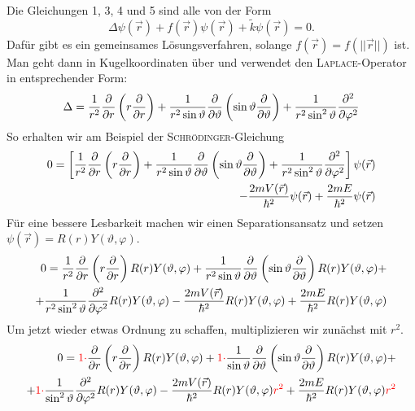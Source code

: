 \documentclass[a4paper,12pt,portrait]{book}
\numberwithin{equation}{section}
\begin{document}
Die Gleichungen 1, 3, 4 und 5 sind alle von der Form
\begin{equation*}
\Delta\psi(\vec{r}) + f(\vec{r})\psi(\vec{r}) + \tilde{k}\psi(\vec{r}) = 0.
\end{equation*}
Dafür gibt es ein gemeinsames Lösungsverfahren, solange $f(\vec{r}) = f\left(||\vec{r}||\right)$ ist. Man geht dann in Kugelkoordinaten über und verwendet den \textsc{Laplace}-Operator in entsprechender Form:
\begin{equation*}
\Delta = \frac{1}{r^2}\frac{\partial{}}{\partial{r}}\left(r\frac{\partial{}}{\partial{r}}\right) + \frac{1}{r^2\sin\vartheta}\frac{\partial{}}{\partial{\vartheta}}\left(\sin\vartheta\frac{\partial{}}{\partial{\vartheta}}\right) + \frac{1}{r^2\sin^2\vartheta}\frac{\partial^2}{\partial\varphi^2}
\end{equation*}
So erhalten wir am Beispiel der \textsc{Schrödinger}-Gleichung
\begin{align*}
0 = \left[\frac{1}{r^2}\frac{\partial{}}{\partial{r}}\left(r\frac{\partial{}}{\partial{r}}\right) + \frac{1}{r^2\sin\vartheta}\frac{\partial{}}{\partial{\vartheta}}\left(\sin\vartheta\frac{\partial{}}{\partial{\vartheta}}\right) + \frac{1}{r^2\sin^2\vartheta}\frac{\partial^2}{\partial\varphi^2}\right]\psi(\vec{r})  \\  - \frac{2mV(\vec{r})}{\hbar^2}\psi(\vec{r}) + \frac{2mE}{\hbar^2}\psi(\vec{r})
\end{align*}
Für eine bessere Lesbarkeit machen wir einen Separationsansatz und setzen $\psi(\vec{r})=R(r)Y(\vartheta, \varphi)$. 
\begin{align*}
0 = \frac{1}{r^2}\frac{\partial{}}{\partial{r}}\left(r\frac{\partial{}}{\partial{r}}\right)R(r)Y(\vartheta,\varphi) + \frac{1}{r^2\sin\vartheta}\frac{\partial{}}{\partial{\vartheta}}\left(\sin\vartheta\frac{\partial{}}{\partial{\vartheta}}\right)R(r)Y(\vartheta,\varphi) +  \\  + \frac{1}{r^2\sin^2\vartheta}\frac{\partial^2}{\partial\varphi^2}R(r)Y(\vartheta,\varphi) - \frac{2mV(\vec{r})}{\hbar^2}R(r)Y(\vartheta,\varphi) + \frac{2mE}{\hbar^2}R(r)Y(\vartheta,\varphi)
\end{align*}
Um jetzt wieder etwas Ordnung zu schaffen, multiplizieren wir zunächst mit $r^2$. 
\begin{align*}
0 = {\color{red}1\cdot}\frac{\partial{}}{\partial{r}}\left(r\frac{\partial{}}{\partial{r}}\right)R(r)Y(\vartheta,\varphi) + {\color{red}1\cdot}\frac{1}{\sin\vartheta}\frac{\partial{}}{\partial{\vartheta}}\left(\sin\vartheta\frac{\partial{}}{\partial{\vartheta}}\right)R(r)Y(\vartheta,\varphi) +  \\  + {\color{red}1\cdot}\frac{1}{\sin^2\vartheta}\frac{\partial^2}{\partial\varphi^2}R(r)Y(\vartheta,\varphi) - \frac{2mV(\vec{r})}{\hbar^2}R(r)Y(\vartheta,\varphi){\color{red}r^2} + \frac{2mE}{\hbar^2}R(r)Y(\vartheta,\varphi){\color{red}r^2}
\end{align*}
\end{document}

